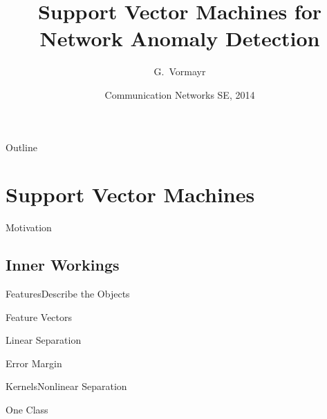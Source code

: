 \documentclass{beamer}
\title[SVM for Network AD]{Support Vector Machines for\\ Network Anomaly Detection}
\author{G.~Vormayr}
\institute{University of Technology Vienna}
\date[CNSE 2014]{Communication Networks SE, 2014}
\begin{document}
\begin{frame}
  \titlepage
\end{frame}

\begin{frame}{Outline}
  \tableofcontents
\end{frame}





\section{Support Vector Machines}

\begin{frame}{Motivation}
\end{frame}

\subsection{Inner Workings}

\begin{frame}{Features}{Describe the Objects}
\end{frame}

\begin{frame}{Feature Vectors}
\end{frame}

\begin{frame}{Linear Separation}
\end{frame}

\begin{frame}{Error Margin}
\end{frame}

\begin{frame}{Kernels}{Nonlinear Separation}
\end{frame}

\begin{frame}{One Class}
\end{frame}
\end{document}
